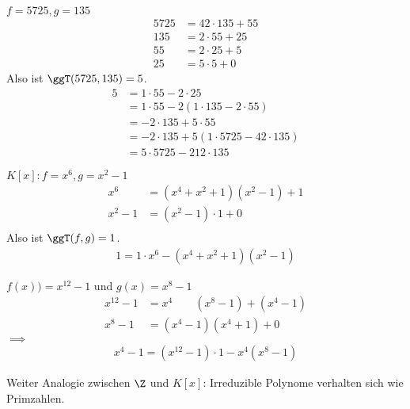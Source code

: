 \documentclass[a4paper, 10pt]{scrbook}
\begin{document}
\begin{ex}
$f=5725, g=135$
\begin{align*}
5725 &= 42\cdot 135 + 55\\
135 &=  2\cdot 55 + 25\\
55 &= 2\cdot 25 + 5\\
25 &= 5\cdot 5 + 0
\end{align*}
Also ist $\ggT(5725,135)=5$.
\begin{align*}
5&=1\cdot 55 - 2\cdot 25\\
&=1\cdot 55 -2(1\cdot 135 - 2\cdot 55)\\
&=-2\cdot 135 + 5\cdot 55\\
&= -2\cdot 135 + 5(1\cdot 5725 - 42\cdot 135)\\
&= 5\cdot 5725 - 212\cdot 135
\end{align*}
\end{ex}

\begin{ex}
$K[x]: f=x^6, g=x^2-1$
\begin{align*}
x^6 &=(x^4+x^2+1)(x^2-1) + 1\\
x^2-1 &= (x^2-1)\cdot 1 + 0\\
\end{align*}
Also ist $\ggT(f,g)=1$.
\begin{align*}
1 = 1\cdot x^6 - (x^4+x^2+1)(x^2-1)
\end{align*}
\end{ex}

\begin{ex}
$f(x)) = x^{12}-1$ und $g(x)=x^8-1$
\begin{align*}
x^{12}-1 &= x^4\qquad (x^8-1)+(x^4-1)\\
x^8 -1 &= (x^4-1)(x^4+1) +0
\end{align*}
$\implies$
\begin{align*}
x^4-1=(x^{12}-1)\cdot 1 -x^4(x^8-1)
\end{align*}
\end{ex}

Weiter Analogie zwischen $\Z$ und $K[x]$:
Irreduzible Polynome verhalten sich wie Primzahlen.
\end{document}
